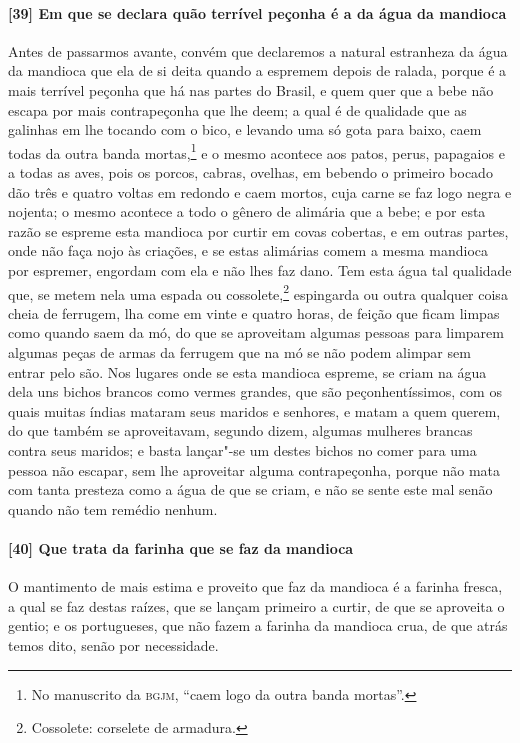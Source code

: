 \begin{linenumbers}
\paragraph{[39] Em que se declara quão terrível peçonha é a da água da mandioca}\quad
Antes de passarmos avante, convém que declaremos a natural estranheza da água da mandioca
que ela de si deita quando a espremem depois de ralada, porque é a mais terrível peçonha
que há nas partes do Brasil, e quem quer que a bebe não escapa por mais contrapeçonha que
lhe deem; a qual é de qualidade que as galinhas em lhe tocando com o bico, e levando uma
só gota para baixo, caem todas da outra banda mortas,\footnote{ No manuscrito da
\textsc{bgjm}, ``caem logo da outra banda mortas''.} e o mesmo acontece aos patos, perus,
papagaios e a todas as aves, pois os porcos, cabras, ovelhas, em bebendo o primeiro bocado
dão três e quatro voltas em redondo e caem mortos, cuja carne se faz logo negra e nojenta;
o mesmo acontece a todo o gênero de alimária que a bebe; e por esta razão se espreme esta
mandioca por curtir em covas cobertas, e em outras partes, onde não faça nojo às criações,
e se estas alimárias comem a mesma mandioca por espremer, engordam com ela e não lhes faz
dano. Tem esta água tal qualidade que, se metem nela uma espada ou cossolete,\footnote{Cossolete: 
corselete de armadura.} espingarda
ou outra qualquer coisa cheia de ferrugem, lha come em vinte
e quatro horas, de feição que ficam limpas como quando saem da mó, do que se aproveitam
algumas pessoas para limparem algumas peças de armas da ferrugem que na mó se não podem
alimpar sem entrar pelo são. Nos lugares onde se esta mandioca espreme, se criam na água
dela uns bichos brancos como vermes grandes, que são peçonhentíssimos, com os quais muitas
índias mataram seus maridos e senhores, e matam a quem querem, do que também se
aproveitavam, segundo dizem, algumas mulheres brancas contra seus maridos; e basta
lançar"-se um destes bichos no comer para uma pessoa não escapar, sem lhe aproveitar alguma
contrapeçonha, porque não mata com tanta presteza como a água de que se criam, e não se
sente este mal senão quando não tem remédio nenhum.

\paragraph{[40] Que trata da farinha que se faz da mandioca}\quad
O mantimento de mais estima e proveito que faz da mandioca é a farinha fresca, a qual se
faz destas raízes, que se lançam primeiro a curtir, de que se aproveita o gentio; e os
portugueses, que não fazem a farinha da mandioca crua, de que atrás temos dito, senão por
necessidade.


\end{linenumbers}
